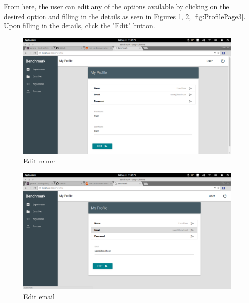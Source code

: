 \documentclass[11pt,a4paper]{article}
\begin{document}
\clearpage
From here, the user can edit any of the options available by clicking on the desired option and filling in the details as seen in
Figures \ref{fig:ProfilePage1}, \ref{fig:ProfilePage2}, \ref{fig:ProfilePage3}. Upon filling in the details, click the "Edit" button.
\begin{figure}[H]
	\begin{center}
		\includegraphics[scale=0.3]{../Images/User Manual/Profile Page1.png}
		\caption{Edit name}
		\label{fig:ProfilePage1}
	\end{center}  
\end{figure}
\begin{figure}[H]
	\begin{center}
		\includegraphics[scale=0.3]{../Images/User Manual/Profile Page2.png}
		\caption{Edit email}
		\label{fig:ProfilePage2}
	\end{center}  
\end{figure}
\end{document}
